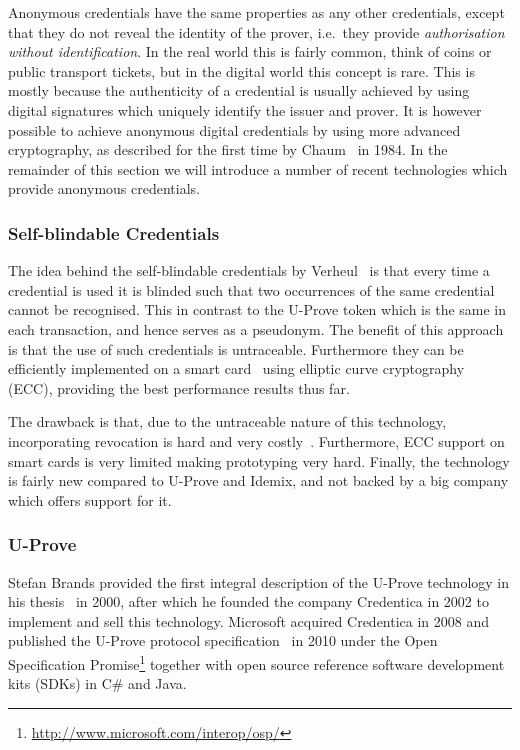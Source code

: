 Anonymous credentials have the same properties as any other credentials,
except that they do not reveal the identity of the prover, i.e.\ they provide
\emph{authorisation without identification}. In the real world this is
fairly common, think of coins or public transport tickets, but in the
digital world this concept is rare. This is mostly because the
authenticity of a credential is usually achieved by using digital
signatures which uniquely identify the issuer and prover. It is however
possible to achieve anonymous digital credentials by using more advanced
cryptography, as described for the first time by Chaum~\cite{Chaum1985} in
1984. In the remainder of this section we will introduce a number of recent
technologies which provide anonymous credentials.

\subsubsection{Self-blindable Credentials}\label{sec:selfblindable}

The idea behind the self-blindable credentials by
Verheul~\cite{Verheul01} is that every time a credential is used it is
blinded such that two occurrences of the same credential cannot be
recognised. This in contrast to the U-Prove token which is the same in
each transaction, and hence serves as a pseudonym. The benefit of this
approach is that the use of such credentials is
untraceable. Furthermore they can be efficiently implemented on a
smart card~\cite{BatinaHJMV10,HoepmanJV10} using elliptic curve
cryptography (ECC), providing the best performance results thus far.

The drawback is that, due to the untraceable nature of this technology,
incorporating revocation is hard and very costly~\cite{HoepmanLV11}. %
Furthermore, ECC support on smart cards is very limited making prototyping
very hard. Finally, the technology is fairly new compared to U-Prove and
Idemix, and not backed by a big company which offers support for it.

\subsubsection{U-Prove}\label{sec:uprove}

Stefan Brands provided the first integral description of the U-Prove
technology in his thesis~\cite{Brands2000} in 2000, after which he founded
the company Credentica in 2002 to implement and sell this technology.
Microsoft acquired Credentica in 2008 and published the U-Prove protocol
specification~\cite{U-Prove_Crypto2010} in 2010 under the Open
Specification
Promise\footnote{\url{http://www.microsoft.com/interop/osp/}} together with
open source reference software development kits (SDKs) in C\# and Java.

